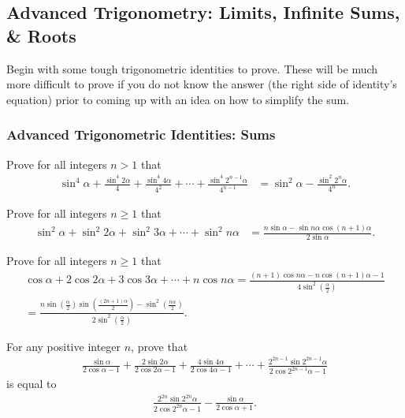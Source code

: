 \documentclass[12pt,a4paper]{memoir}
\theoremstyle{definition}
\begin{document}
\newpage
\subsection{Advanced Trigonometry: Limits, Infinite Sums, \& Roots}
Begin with some tough trigonometric identities to prove. These will be much more difficult to prove if you do not know the answer (the right side of identity's equation) prior to coming up with an idea on how to simplify the sum.

\subsubsection{Advanced Trigonometric Identities: Sums}

\begin{question}
	Prove for all integers $n>1$ that
	\begin{align*}
		\sin^4\alpha + \frac{\sin^4 2\alpha}{4}+\frac{\sin^4 4\alpha}{4^2} + \cdots + \frac{\sin^4 2^{n-1}\alpha}{4^{n-1}} &= \sin^2\alpha - \frac{\sin^2 2^n\alpha}{4^n}.
	\end{align*}
\end{question}


\begin{question}
	Prove for all integers $n\geq 1$ that
	\begin{align*}
		\sin^2\alpha + \sin^2 2\alpha + \sin^2 3\alpha + \cdots + \sin^2 n\alpha &= \frac{n\sin \alpha - \sin n\alpha \cos (n+1)\alpha}{2\sin\alpha}.
	\end{align*}
\end{question}


\begin{question}
	Prove for all integers $n\geq 1$ that
	\begin{multline*}
		\cos\alpha + 2\cos 2\alpha + 3\cos 3\alpha + \cdots + n\cos n\alpha = \frac{(n+1)\cos n\alpha - n\cos(n+1)\alpha - 1}{\displaystyle 4\sin^2\left(\frac{\alpha}{2}\right)}\\
		= \frac{\displaystyle n\sin\left(\frac{\alpha}{2}\right)\sin\left(\frac{(2n+1)\alpha}{2}\right) - \sin^2\left(\frac{n\alpha}{2}\right)}{\displaystyle 2\sin^2\left(\frac{\alpha}{2}\right)}.
	\end{multline*}
\end{question}


\begin{question}
	For any positive integer $n$, prove that
	\begin{align*}
		\frac{\sin\alpha}{2\cos\alpha-1} + \frac{2\sin 2\alpha}{2\cos 2\alpha -1} + \frac{4\sin 4\alpha}{2\cos 4\alpha - 1} + \cdots + \frac{2^{2n-1}\sin 2^{2n-1}\alpha}{2\cos 2^{2n-1}\alpha - 1}
	\end{align*}
	is equal to
	\begin{align*}
		\frac{2^{2n}\sin 2^{2n}\alpha}{2\cos 2^{2n}\alpha - 1} - \frac{\sin \alpha}{2\cos \alpha + 1}.
	\end{align*}
\end{question}
\end{document}
